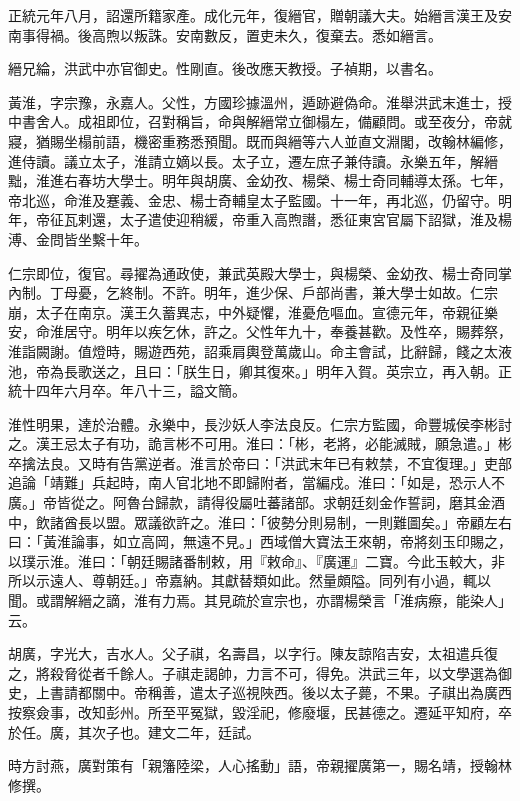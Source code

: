 \begin{pinyinscope}
正統元年八月，詔還所籍家產。成化元年，復縉官，贈朝議大夫。始縉言漢王及安南事得禍。後高煦以叛誅。安南數反，置吏未久，復棄去。悉如縉言。

縉兄綸，洪武中亦官御史。性剛直。後改應天教授。子禎期，以書名。

黃淮，字宗豫，永嘉人。父性，方國珍據溫州，遁跡避偽命。淮舉洪武末進士，授中書舍人。成祖即位，召對稱旨，命與解縉常立御榻左，備顧問。或至夜分，帝就寢，猶賜坐榻前語，機密重務悉預聞。既而與縉等六人並直文淵閣，改翰林編修，進侍讀。議立太子，淮請立嫡以長。太子立，遷左庶子兼侍讀。永樂五年，解縉黜，淮進右春坊大學士。明年與胡廣、金幼孜、楊榮、楊士奇同輔導太孫。七年，帝北巡，命淮及蹇義、金忠、楊士奇輔皇太子監國。十一年，再北巡，仍留守。明年，帝征瓦剌還，太子遣使迎稍緩，帝重入高煦譖，悉征東宮官屬下詔獄，淮及楊溥、金問皆坐繫十年。

仁宗即位，復官。尋擢為通政使，兼武英殿大學士，與楊榮、金幼孜、楊士奇同掌內制。丁母憂，乞終制。不許。明年，進少保、戶部尚書，兼大學士如故。仁宗崩，太子在南京。漢王久蓄異志，中外疑懼，淮憂危嘔血。宣德元年，帝親征樂安，命淮居守。明年以疾乞休，許之。父性年九十，奉養甚歡。及性卒，賜葬祭，淮詣闕謝。值燈時，賜遊西苑，詔乘肩輿登萬歲山。命主會試，比辭歸，餞之太液池，帝為長歌送之，且曰：「朕生日，卿其復來。」明年入賀。英宗立，再入朝。正統十四年六月卒。年八十三，謚文簡。

淮性明果，達於治體。永樂中，長沙妖人李法良反。仁宗方監國，命豐城侯李彬討之。漢王忌太子有功，詭言彬不可用。淮曰：「彬，老將，必能滅賊，願急遣。」彬卒擒法良。又時有告黨逆者。淮言於帝曰：「洪武末年已有敕禁，不宜復理。」吏部追論「靖難」兵起時，南人官北地不即歸附者，當編戍。淮曰：「如是，恐示人不廣。」帝皆從之。阿魯台歸款，請得役屬吐蕃諸部。求朝廷刻金作誓詞，磨其金酒中，飲諸酋長以盟。眾議欲許之。淮曰：「彼勢分則易制，一則難圖矣。」帝顧左右曰：「黃淮論事，如立高岡，無遠不見。」西域僧大寶法王來朝，帝將刻玉印賜之，以璞示淮。淮曰：「朝廷賜諸番制敕，用『敕命』、『廣運』二寶。今此玉較大，非所以示遠人、尊朝廷。」帝嘉納。其獻替類如此。然量頗隘。同列有小過，輒以聞。或謂解縉之謫，淮有力焉。其見疏於宣宗也，亦謂楊榮言「淮病瘵，能染人」云。

胡廣，字光大，吉水人。父子祺，名壽昌，以字行。陳友諒陷吉安，太祖遣兵復之，將殺脅從者千餘人。子祺走謁帥，力言不可，得免。洪武三年，以文學選為御史，上書請都關中。帝稱善，遣太子巡視陜西。後以太子薨，不果。子祺出為廣西按察僉事，改知彭州。所至平冤獄，毀淫祀，修廢堰，民甚德之。遷延平知府，卒於任。廣，其次子也。建文二年，廷試。

時方討燕，廣對策有「親籓陸梁，人心搖動」語，帝親擢廣第一，賜名靖，授翰林修撰。


\end{pinyinscope}
